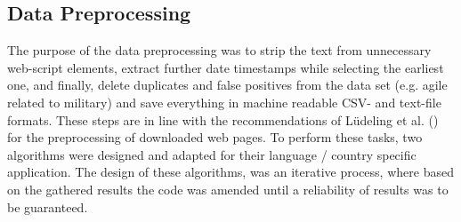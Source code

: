 \subsection{Data Preprocessing}
The purpose of the data  preprocessing was to strip the text from unnecessary web-script elements, extract further date timestamps while selecting the earliest one, and finally, delete duplicates and false positives from the data set (e.g. agile related to military) and save everything in machine readable CSV- and text-file formats. These steps are in line with the recommendations of Lüdeling et al. (\cite*[p. 19]{Ludeling2015}) for the preprocessing of downloaded web pages. To perform these tasks, two algorithms were designed and adapted for their language / country specific application. The design of these algorithms, was an iterative process, where based on the gathered results the code was amended until a reliability of results was to be guaranteed.\par 
